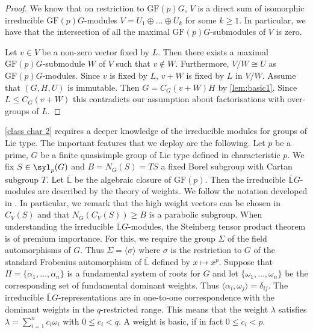 \documentclass[12pt]{amsart}
\theoremstyle{remark}
\theoremstyle{notation}
\theoremstyle{definition}
\newcommand{\GF}{\mathrm{GF}}
\newcommand{\0}{\emptyset}
\begin{document}
\begin{proof} We know that on restriction to $\GF(p)G$, $V$ is a direct sum of isomorphic irreducible $\GF(p)G$-modules $V= U_1\oplus\dots \oplus U_k$ for some $k \ge 1$. In particular, we have that the intersection of all the maximal $\GF(p)G$-submodules of $V$ is zero.

Let $v \in V$ be a non-zero vector fixed by $L$. Then there exists a maximal $\GF(p)G$-submodule $W$ of $V$ such that $v \not \in W$. Furthermore, $V/W\cong U$ as $\GF(p)G$-modules. Since $v$ is fixed by $L$, $v+W$ is fixed by $L$ in $V/W$. Assume that $(G,H,U)$ is immutable.
   Then   $G= C_G(v+W)H$ by \cref{lem:basic1}. Since $L \le C_G(v+W)$ this contradicts our assumption about factorisations with over-groups of $L$.
\end{proof}




\cref{class char 2} requires a deeper knowledge of the irreducible modules for groups of Lie type.
The important features that we deploy  are the following.  Let $p$ be a prime, $G$ be a finite quasisimple group of Lie type defined in characteristic $p$. We fix $S \in \syl_p(G)$ and $B=N_G(S)=TS$ a fixed Borel subgroup with Cartan subgroup $T$. Let $\overline{\mathbb L}$ be the algebraic closure of $\GF(p)$.  Then the irreducible  $\overline{\mathbb L} G$-modules are described by the theory of weights. We follow the notation developed in \cite[Sections 1.14 and 2.8]{GLS3}. In particular, we remark that the high weight vectors can be chosen in $C_V(S)$ and that $N_G(C_V(S)) \ge B$ is   a parabolic subgroup. When understanding the irreducible  $\overline{\mathbb L} G$-modules, the Steinberg tensor product theorem is of premium importance. For this, we require the group $\Sigma$ of the field automorphisms of $G$. Thus $\Sigma=\langle \sigma\rangle$ where $\sigma$ is the restriction to $G$ of the    standard Frobenius automorphism of $\overline{\mathbb L}$ defined by $x \mapsto x^p$. Suppose that $\Pi=\{\alpha_1, \dots, \alpha_n\}$ is a fundamental system of roots for $G$ and let $\{\omega_1, \dots, \omega_n\}$ be the corresponding set of fundamental dominant weights.  Thus $\langle \alpha_i,\omega_j\rangle =\delta_{ij}$.   The irreducible $\overline{\mathbb L} G$-representations are in one-to-one correspondence with the dominant weights in the $q$-restricted range. This means that the weight $\lambda$ satisfies $\lambda=\sum_{i=1}^n c_i \omega_i$ with $0\le c_i < q$.  A weight is basic, if in fact $0\le c_i <p$.
\end{document}
